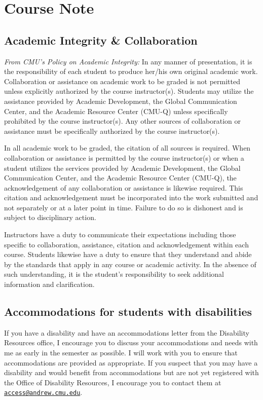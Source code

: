 \documentclass{article}
\begin{document}
\section*{Course Note}

\subsection*{Academic Integrity \& Collaboration}

\textit{From CMU's Policy on Academic Integrity:} In any manner of presentation,
it is the responsibility of each student to produce her/his own original
academic work. Collaboration or assistance on academic work to be graded is not
permitted unless explicitly authorized by the course instructor(s). Students may
utilize the assistance provided by Academic Development, the Global
Communication Center, and the Academic Resource Center (CMU-Q) unless
specifically prohibited by the course instructor(s). Any other sources of
collaboration or assistance must be specifically authorized by the course
instructor(s).
 
In all academic work to be graded, the citation of all sources is required. When
collaboration or assistance is permitted by the course instructor(s) or when a
student utilizes the services provided by Academic Development, the Global
Communication Center, and the Academic Resource Center (CMU-Q), the
acknowledgement of any collaboration or assistance is likewise required. This
citation and acknowledgement must be incorporated into the work submitted and
not separately or at a later point in time. Failure to do so is dishonest and is
subject to disciplinary action.

Instructors have a duty to communicate their expectations including those
specific to collaboration, assistance, citation and acknowledgement within each
course. Students likewise have a duty to ensure that they understand and abide
by the standards that apply in any course or academic activity. In the absence
of such understanding, it is the student’s responsibility to seek additional
information and clarification.

\subsection*{Accommodations for students with disabilities}

If you have a disability and have an accommodations letter from the Disability
Resources office, I encourage you to discuss your accommodations and needs with
me as early in the semester as possible. I will work with you to ensure that
accommodations are provided as appropriate. If you suspect that you may have a
disability and would benefit from accommodations but are not yet registered with
the Office of Disability Resources, I encourage you to contact them at
\href{mailto:access@andrew.cmu.edu}{\texttt{access@andrew.cmu.edu}}.
\end{document}
